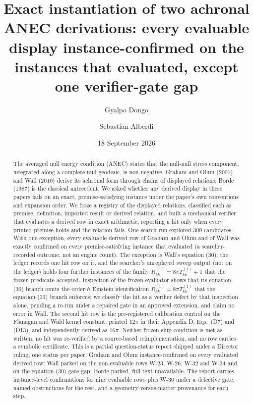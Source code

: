\documentclass[11pt]{article}
\title{Exact instantiation of two achronal ANEC derivations: every evaluable display instance-confirmed on the instances that evaluated, except one verifier-gate gap}
\author{Gyalpo Dongo \and Sebastian Alberdi}
\date{18 September 2026}
\begin{document}
\maketitle

\begin{abstract}
The averaged null energy condition (ANEC) states that the null-null stress component, integrated along a complete null geodesic, is non-negative. Graham and Olum (2007) and Wall (2010) derive its achronal form through chains of displayed relations; Borde (1987) is the classical antecedent. We asked whether any derived display in these papers fails on an exact, premise-satisfying instance under the paper's own conventions and expansion order. We froze a registry of the displayed relations, classified each as premise, definition, imported result or derived relation, and built a mechanical verifier that evaluates a derived row in exact arithmetic, reporting a hit only when every printed premise holds and the relation fails. One search run explored 309 candidates. With one exception, every evaluable derived row of Graham and Olum and of Wall was exactly confirmed on every premise-satisfying instance that evaluated (a searcher-recorded outcome, not an engine count). The exception is Wall's equation (30): the ledger records one hit row on it, and the searcher's unreplayed sweep output (not on the ledger) holds four further instances of the family $R^{(1)}_{kk} = 8\pi T^{(1)}_{kk} + 1$ that the frozen predicate accepted. Inspection of the frozen evaluator shows that its equation-(30) branch omits the order-$\hbar$ Einstein identification $R^{(1)}_{kk} = 8\pi T^{(1)}_{kk}$ that the equation-(31) branch enforces; we classify the hit as a verifier defect by that inspection alone, pending a re-run under a repaired gate in an approved extension, and claim no error in Wall. The second hit row is the pre-registered calibration control on the Flanagan and Wald kernel constant, printed $12\pi$ in their Appendix D, Eqs.\ (D7) and (D13), and independently derived as $16\pi$. Neither frozen ship condition is met as written: no hit was re-verified by a source-based reimplementation, and no row carries a symbolic certificate. This is a partial question-status report shipped under a Director ruling, one status per paper: Graham and Olum instance-confirmed on every evaluated derived row; Wall parked on the non-evaluable rows W-23, W-26, W-32 and W-34 and on the equation-(30) gate gap; Borde parked, full text unavailable. The report carries instance-level confirmations for nine evaluable rows plus W-30 under a defective gate, named obstructions for the rest, and a geometry-versus-matter provenance for each step.
\end{abstract}
\end{document}
